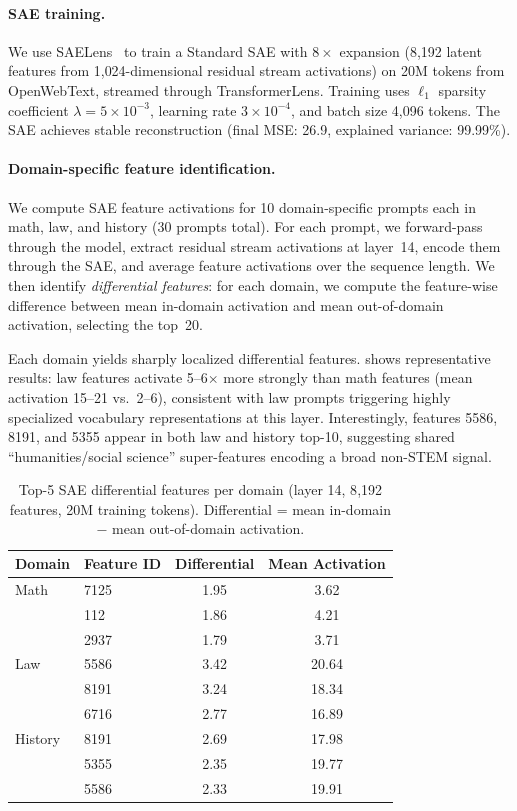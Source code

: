 \documentclass[11pt,a4paper]{article}
\begin{document}
\paragraph{SAE training.}
We use SAELens~\cite{bloom2024saelens} to train a Standard SAE with $8\times$ expansion (8{,}192 latent features from 1{,}024-dimensional residual stream activations) on 20M tokens from OpenWebText, streamed through TransformerLens. Training uses $\ell_1$ sparsity coefficient $\lambda = 5 \times 10^{-3}$, learning rate $3 \times 10^{-4}$, and batch size 4{,}096 tokens. The SAE achieves stable reconstruction (final MSE: 26.9, explained variance: 99.99\%).

\paragraph{Domain-specific feature identification.}
We compute SAE feature activations for 10 domain-specific prompts each in math, law, and history (30 prompts total). For each prompt, we forward-pass through the model, extract residual stream activations at layer~14, encode them through the SAE, and average feature activations over the sequence length. We then identify \textit{differential features}: for each domain, we compute the feature-wise difference between mean in-domain activation and mean out-of-domain activation, selecting the top~20.

Each domain yields sharply localized differential features.  shows representative results: law features activate 5--6$\times$ more strongly than math features (mean activation 15--21 vs.\ 2--6), consistent with law prompts triggering highly specialized vocabulary representations at this layer. Interestingly, features 5586, 8191, and 5355 appear in both law and history top-10, suggesting shared ``humanities/social science'' super-features encoding a broad non-STEM signal.

\begin{table}[H]
\centering
\caption{Top-5 SAE differential features per domain (layer 14, 8{,}192 features, 20M training tokens). Differential = mean in-domain $-$ mean out-of-domain activation.}
\label{tab:sae_domain}
\small
\begin{tabular}{llcc}
\toprule
\textbf{Domain} & \textbf{Feature ID} & \textbf{Differential} & \textbf{Mean Activation} \\
\midrule
Math    & 7125 & 1.95 & 3.62 \\
        & 112  & 1.86 & 4.21 \\
        & 2937 & 1.79 & 3.71 \\
\midrule
Law     & 5586 & 3.42 & 20.64 \\
        & 8191 & 3.24 & 18.34 \\
        & 6716 & 2.77 & 16.89 \\
\midrule
History & 8191 & 2.69 & 17.98 \\
        & 5355 & 2.35 & 19.77 \\
        & 5586 & 2.33 & 19.91 \\
\bottomrule
\end{tabular}
\end{table}
\end{document}
